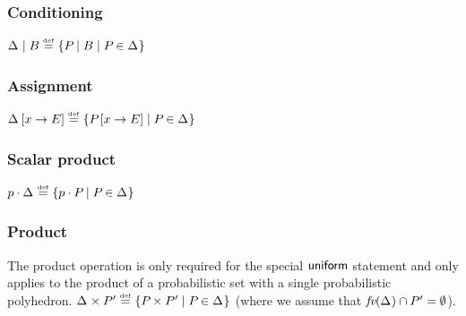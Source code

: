 \subsubsection{Conditioning} $ \Delta_{} \mid B \stackrel{\smash{\scriptscriptstyle \mathrm{def}}}=
\left\{ P_{} \mid B \mid P_{} \in \Delta_{} \right\} $


\subsubsection{Assignment} $ \Delta_{} \left[ x \rightarrow E \right] \stackrel{\smash{\scriptscriptstyle \mathrm{def}}}=
  \left\{ P_{} \left[ x \rightarrow E \right] \mid P_{} \in \Delta_{} \right\} $


\subsubsection{Scalar product} $ p \cdot \Delta_{} \stackrel{\smash{\scriptscriptstyle \mathrm{def}}}= \left\{ p
  \cdot P_{} \mid P_{} \in \Delta_{} \right\} $


\subsubsection{Product} The product operation is only required for the
special $ \mathsf{uniform} $ statement and only applies to the product
of a probabilistic set with a single probabilistic polyhedron.
$ \Delta_{} \times P_{}' \stackrel{\smash{\scriptscriptstyle \mathrm{def}}}= \left\{ P_{} \times P_{}' \mid P_{} \in \Delta_{} \right\} $
(where we assume that $\textit{fv}(\Delta_{}) \cap P_{}' = \emptyset$).



